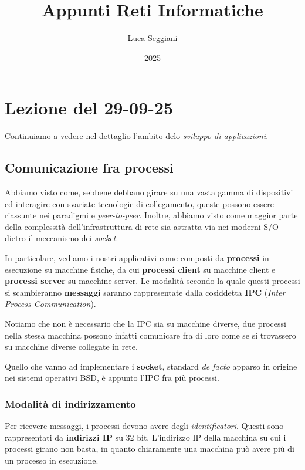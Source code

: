 \documentclass[a4paper,11pt]{article}
\title{Appunti Reti Informatiche}
\author{Luca Seggiani}
\date{2025}
\begin{document}
\section{Lezione del 29-09-25}

\thispagestyle{empty}
\pagestyle{fancy}

Continuiamo a vedere nel dettaglio l'ambito delo \textit{sviluppo di applicazioni}.

\subsection{Comunicazione fra processi}
Abbiamo visto come, sebbene debbano girare su una vasta gamma di dispositivi ed interagire con svariate tecnologie di collegamento, queste possono essere riassunte nei paradigmi  e \textit{peer-to-peer}.
Inoltre, abbiamo visto come maggior parte della complessità dell'infrastruttura di rete sia astratta via nei moderni S/O dietro il meccanismo dei \textit{socket}.

In particolare, vediamo i nostri applicativi come composti da \textbf{processi} in esecuzione su macchine fisiche, da cui \textbf{processi client} su macchine client e \textbf{processi server} su macchine server.
Le modalità secondo la quale questi processi si scambieranno \textbf{messaggi} saranno rappresentate dalla cosiddetta \textbf{IPC} (\textit{Inter Process Communication}).

Notiamo che non è necessario che la IPC sia su macchine diverse, due processi nella stessa macchina possono infatti comunicare fra di loro come se si trovassero su macchine diverse collegate in rete.

Quello che vanno ad implementare i \textbf{socket}, standard \textit{de facto} apparso in origine nei sistemi operativi BSD, è appunto l'IPC fra più processi.

\subsubsection{Modalità di indirizzamento}
Per ricevere messaggi, i processi devono avere degli \textit{identificatori}.
Questi sono rappresentati da \textbf{indirizzi IP} su 32 bit.
L'indirizzo IP della macchina su cui i processi girano non basta, in quanto chiaramente una macchina può avere più di un processo in esecuzione.
\end{document}
